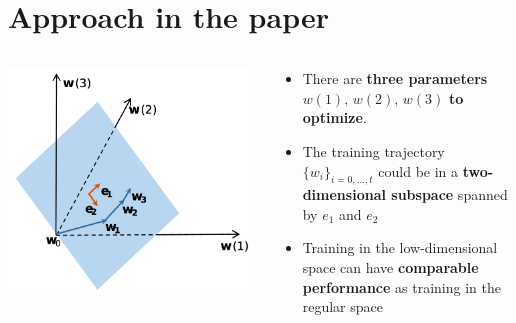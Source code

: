 \documentclass[t]{beamer}
\begin{document}
\section{Approach in the paper}
\begin{frame}
\begin{columns}[c]

\begin{column}{0.5\textwidth}
\begin{center}
\includegraphics[width=0.99\textwidth]{approach.png}
\end{center}
\end{column}

\begin{column}{0.5\textwidth}
\begin{itemize}
\item There are \textbf{three parameters} $w(1)$, $w(2)$, $w(3)$ \textbf{to optimize}. \vspace{1cm}
\item The training trajectory $\{w_i\}_{i=0,\dots,t}$ could be in a \textbf{two-dimensional subspace} spanned by $e_1$ and $e_2$ \vspace{1cm} 
\item Training in the low-dimensional space can have \textbf{comparable performance} as training in the regular space
\end{itemize}
\end{column}

\end{columns}
\end{frame}
\end{document}
